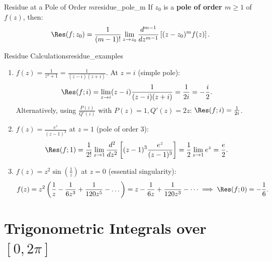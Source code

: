\begin{proposition}{Residue at a Pole of Order $m$}{residue_pole_m}
If $z_0$ is a \textbf{pole of order $m \ge 1$} of $f(z)$, then:
\begin{equation}
\Res(f; z_0) = \frac{1}{(m - 1)!} \lim_{z \to z_0} \frac{d^{m-1}}{dz^{m-1}} \left[ (z - z_0)^m f(z) \right].
\end{equation}
\end{proposition}

\begin{example}{Residue Calculations}{residue_examples}
\begin{enumerate}
    \item $f(z) = \frac{1}{z^2 + 1} = \frac{1}{(z-i)(z+i)}$. At $z = i$ (simple pole):
    \begin{equation}
    \Res(f; i) = \lim_{z \to i} (z - i)\frac{1}{(z - i)(z + i)} = \frac{1}{2i} = -\frac{i}{2}.
    \end{equation}
    Alternatively, using $\frac{P(z)}{Q'(z)}$ with $P(z) = 1, Q'(z) = 2z$: $\Res(f; i) = \frac{1}{2i}$.
    \item $f(z) = \frac{e^z}{(z - 1)^3}$ at $z = 1$ (pole of order 3):
    \begin{equation}
    \Res(f; 1) = \frac{1}{2!} \lim_{z \to 1} \frac{d^2}{dz^2}\left[ (z - 1)^3 \frac{e^z}{(z - 1)^3} \right] = \frac{1}{2} \lim_{z \to 1} e^z = \frac{e}{2}.
    \end{equation}
    \item $f(z) = z^2 \sin\left(\frac{1}{z}\right)$ at $z = 0$ (essential singularity):
    \begin{equation}
    f(z) = z^2 \left( \frac{1}{z} - \frac{1}{6z^3} + \frac{1}{120z^5} - \dots \right) = z - \frac{1}{6z} + \frac{1}{120z^3} - \dots \implies \Res(f; 0) = -\frac{1}{6}.
    \end{equation}
\end{enumerate}
\end{example}


\section{Trigonometric Integrals over \texorpdfstring{$[0, 2\pi]$}{[0, 2pi]}}

